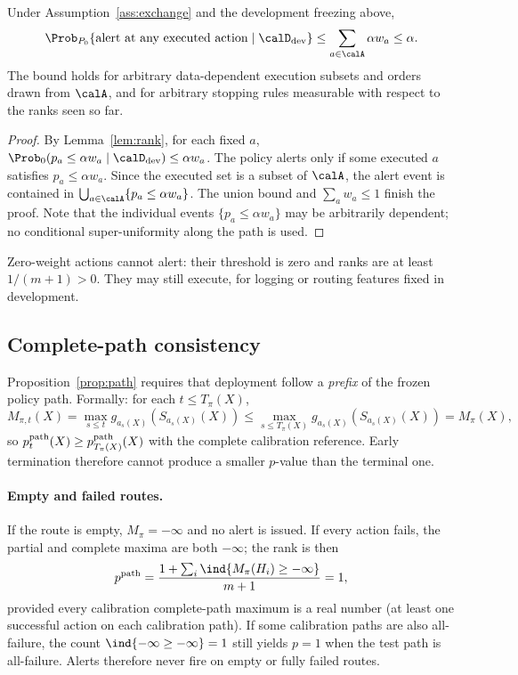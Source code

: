 \begin{proposition}\label{prop:spending-full}
Under Assumption~\ref{ass:exchange} and the development freezing above,
\[
 \Prob_{P_0}\{\text{alert at any executed action}\mid \calD_{\rm dev}\}
 \leq \sum_{a\in\calA}\alpha w_a \leq \alpha.
\]
The bound holds for arbitrary data-dependent execution subsets and orders drawn from \(\calA\), and for arbitrary stopping rules measurable with respect to the ranks seen so far.
\end{proposition}
\begin{proof}
By Lemma~\ref{lem:rank}, for each fixed \(a\), \(\Prob_0(p_a\leq\alpha w_a\mid\calD_{\rm dev})\leq\alpha w_a\). The policy alerts only if some executed \(a\) satisfies \(p_a\leq\alpha w_a\). Since the executed set is a subset of \(\calA\), the alert event is contained in \(\bigcup_{a\in\calA}\{p_a\leq\alpha w_a\}\). The union bound and \(\sum_a w_a\leq1\) finish the proof. Note that the individual events \(\{p_a\leq\alpha w_a\}\) may be arbitrarily dependent; no conditional super-uniformity along the path is used.
\end{proof}

Zero-weight actions cannot alert: their threshold is zero and ranks are at least \(1/(m+1)>0\). They may still execute, for logging or routing features fixed in development.

\subsection{Complete-path consistency}\label{app:complete-path}

Proposition~\ref{prop:path} requires that deployment follow a \emph{prefix} of the frozen policy path. Formally: for each \(t\leq T_\pi(X)\),
\[
 M_{\pi,t}(X)=\max_{s\leq t} g_{a_s(X)}(S_{a_s(X)}(X))
 \leq \max_{s\leq T_\pi(X)} g_{a_s(X)}(S_{a_s(X)}(X))=M_\pi(X),
\]
so \(p^{\rm path}_t(X)\geq p^{\rm path}_{T_\pi(X)}(X)\) with the complete calibration reference. Early termination therefore cannot produce a smaller \(p\)-value than the terminal one.

\paragraph*{Empty and failed routes.}
If the route is empty, \(M_\pi=-\infty\) and no alert is issued. If every action fails, the partial and complete maxima are both \(-\infty\); the rank is then
\[
 p^{\rm path}=\frac{1+\sum_i\ind\{M_\pi(H_i)\geq -\infty\}}{m+1}=1,
\]
provided every calibration complete-path maximum is a real number (at least one successful action on each calibration path). If some calibration paths are also all-failure, the count \(\ind\{-\infty\geq-\infty\}=1\) still yields \(p=1\) when the test path is all-failure. Alerts therefore never fire on empty or fully failed routes.

